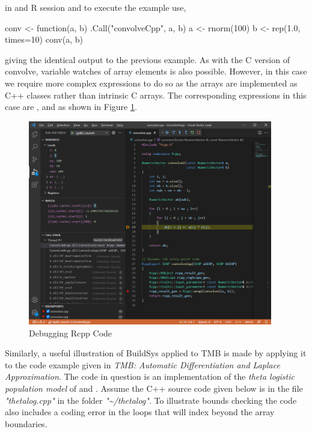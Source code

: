in and R session and to execute the example use,

\begin{Schunk}
  \begin{Sinput}
  conv <- function(a, b) .Call("convolveCpp", a, b)
  a <- rnorm(100)
  b <- rep(1.0, times=10)
  conv(a, b)
  \end{Sinput}
\end{Schunk}

giving the identical output to the previous example. As with the C version of convolve, variable watches of 
array elements is also possible. However, in this case we require more complex expressions to do so as the 
arrays are implemented as C++ classes rather than intrinsic C arrays. The corresponding expressions in this
case are ,  and  as 
shown in Figure \ref{fig:RcppDebug}.

\begin{Schunk}
  \begin{figure}[htbp]
  {\centering \includegraphics[width=0.95\textwidth]{RcppDebug} 

  }
  \caption[Debugging Rcpp Code]{Debugging Rcpp Code}\label{fig:RcppDebug}
  \end{figure}
\end{Schunk}

Similarly, a useful illustration of BuildSys applied to TMB is made by applying it to the code example given 
in \emph{TMB: Automatic Differentiation and Laplace Approximation}\citep{TMBlaplace}. The code in question is 
an implementation of the \emph{theta logistic population model} of \citep{WangG} and \citep{PedersenEtAl}.
Assume the C++ source code given below is in the file \emph{"thetalog.cpp"} in the folder \emph{"\textasciitilde/thetalog"}. 
To illustrate bounds checking the code also includes a coding error in the loops that will index beyond the array boundaries.

